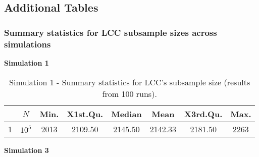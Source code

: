 \subsection{Additional Tables}
\label{app:additional-tables}

\subsubsection{Summary statistics for LCC subsample sizes across simulations}
\label{app:summary-stats-Ns}

\textbf{Simulation 1}
\begin{table}[H]
\centering
\begin{tabular}{cccccccc}
  \hline
 & $N$ & Min. & X1st.Qu. & Median & Mean & X3rd.Qu. & Max. \\ 
  \hline
1 & $10^5$ & 2013 & 2109.50 & 2145.50 & 2142.33 & 2181.50 & 2263 \\ 
   \hline
\end{tabular}
\caption[Simulation 1 - Summary statistics for LCC's subsample size.]{Simulation 1 - Summary statistics for LCC's subsample size (results from 100 runs).}
\label{tab:sim1-Ns}
\end{table}

\textbf{Simulation 3}

